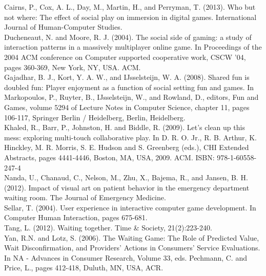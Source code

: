 Cairns, P., Cox, A. L., Day, M., Martin, H., and Perryman, T. (2013). Who but not where: The effect of social play on immersion in digital games. International Journal of Human-Computer Studies.
\vspace{0.15cm}\\
Ducheneaut, N. and Moore, R. J. (2004). The social side of gaming: a study of interaction patterns in a massively multiplayer online game. In Proceedings of the 2004 ACM conference on Computer supported cooperative work, CSCW '04, pages 360-369, New York, NY, USA. ACM.
\vspace{0.15cm}\\
Gajadhar, B. J., Kort, Y. A. W., and IJsselsteijn, W. A. (2008). Shared fun is doubled fun: Player enjoyment as a function of social setting fun and games. In Markopoulos, P., Ruyter, B., IJsselsteijn, W., and Rowland, D., editors, Fun and Games, volume 5294 of Lecture Notes in Computer Science, chapter 11, pages 106-117, Springer Berlin / Heidelberg, Berlin, Heidelberg.
\vspace{0.15cm}\\
Khaled, R., Barr, P., Johnston, H. and Biddle, R. (2009). Let's clean up this mess: exploring multi-touch collaborative play. In D. R. O. Jr., R. B. Arthur, K. Hinckley, M. R. Morris, S. E. Hudson and S. Greenberg (eds.), CHI Extended Abstracts, pages 4441-4446, Boston, MA, USA, 2009. ACM. ISBN: 978-1-60558-247-4
\vspace{0.15cm}\\
Nanda, U., Chanaud, C., Nelson, M., Zhu, X., Bajema, R., and Jansen, B. H. (2012). Impact of visual art on patient behavior in the emergency department waiting room. The Journal of Emergency Medicine.
\vspace{0.15cm}\\
Sellar, T. (2004). User experience in interactive computer game development. In Computer Human Interaction, pages 675-681.
\vspace{0.15cm}\\
Tang, L. (2012). Waiting together. Time \& Society, 21(2):223-240.
\vspace{0.15cm}\\
Yan, R.N. and Lotz, S. (2006). The Waiting Game: The Role of Predicted Value, Wait Disconfirmation, and Providers' Actions in Consumers' Service Evaluations. In NA - Advances in Consumer Research, Volume 33, eds. Pechmann, C. and Price, L., pages 412-418, Duluth, MN, USA, ACR.


